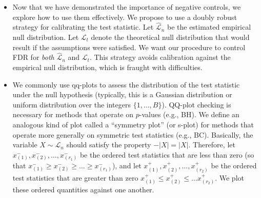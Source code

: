 \documentclass[12pt]{article}
\begin{document}
\begin{itemize}

\item Now that we have demonstrated the importance of negative controls, we explore how to use them effectively. We propose to use a doubly robust strategy for calibrating the test statistic. Let $\hat{\mathcal{L}}_n$ be the estimated empirical null distribution. Let $\mathcal{L}_t$ denote the theoretical null distribution that would result if the assumptions were satisfied. We want our procedure to control FDR for \textit{both} $\hat{\mathcal{L}}_n$ and $\mathcal{L}_t$. This strategy avoids calibration against the empirical null distribution, which is fraught with difficulties.

\item We commonly use qq-plots to assess the distribution of the test statistic under the null hypothesis (typically, this is a Gaussian distribution or uniform distribution over the integers $\{1, \dots, B\}$). QQ-plot checking is necessary for methods that operate on $p$-values (e.g., BH). We define an analogous kind of plot called a ``symmetry plot'' (or s-plot) for methods that operate more generally on symmetric test statistics (e.g., BC). Basically, the variable $X \sim \mathcal{L}_n$ should satisfy the property $-|X| = |X|.$ Therefore, let $x^{-}_{(1)}, x^{-}_{(2)}, \dots, x^{-}_{(r_1)}$ be the ordered test statistics that are less than zero (so that $x^{-}_{(1)} \geq x^{-}_{(2)} \geq \dots \geq x^{-}_{(r_1)}$), and let  $x^{+}_{(1)}, x^{+}_{(2)}, \dots, x^{+}_{(r_2)}$ be the ordered test statistics that are greater than zero $ x_{(1)}^+ \leq x_{(2)}^+ \leq \dots x_{(r_2)}^+.$ We plot these ordered quantities against one another.


\end{itemize}
\end{document}
